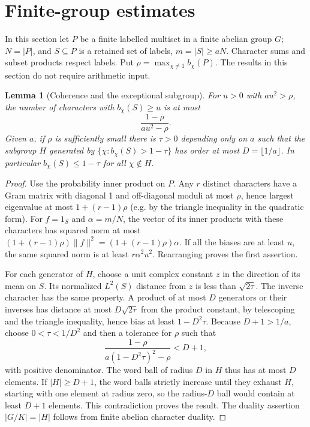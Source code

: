 \documentclass[11pt]{article}
\newtheorem{lemma}[theorem]{Lemma}
\theoremstyle{remark}\newtheorem{remark}[theorem]{Remark}
\newcommand{\norm}[1]{\lVert#1\rVert}\newcommand{\floor}[1]{\lfloor#1\rfloor}\newcommand{\ceil}[1]{\lceil#1\rceil}
\begin{document}
\section{Finite-group estimates}
\label{sec:finite}
In this section let $P$ be a finite labelled multiset in a finite abelian group $G$; $N=|P|$, and $S\subseteq P$ is a retained set of labels, $m=|S|\ge aN$. Character sums and subset products respect labels. Put $\rho=\max_{\chi\ne1}b_\chi(P)$. The results in this section do not require arithmetic input.
\begin{lemma}[Coherence and the exceptional subgroup]\label{lem:gram}
For $u>0$ with $au^2>\rho$, the number of characters with $b_\chi(S)\ge u$ is at most
\[
 \frac{1-\rho}{au^2-\rho}.
\]
Given $a$, if $\rho$ is sufficiently small there is $\tau>0$ depending only on $a$ such that the subgroup $H$ generated by $\{\chi:b_\chi(S)>1-\tau\}$ has order at most $D=\floor{1/a}$. In particular $b_\chi(S)\le1-\tau$ for all $\chi\notin H$.
\end{lemma}
\begin{proof}
Use the probability inner product on $P$. Any $r$ distinct characters have a Gram matrix with diagonal 1 and off-diagonal moduli at most $\rho$, hence largest eigenvalue at most $1+(r-1)\rho$ (e.g. by the triangle inequality in the quadratic form). For $f=1_S$ and $\alpha=m/N$, the vector of its inner products with these characters has squared norm at most $(1+(r-1)\rho)\norm{f}^2=(1+(r-1)\rho)\alpha$. If all the biases are at least $u$, the same squared norm is at least $r\alpha^2u^2$. Rearranging proves the first assertion.

For each generator of $H$, choose a unit complex constant $z$ in the direction of its mean on $S$. Its normalized $L^2(S)$ distance from $z$ is less than $\sqrt{2\tau}$. The inverse character has the same property. A product of at most $D$ generators or their inverses has distance at most $D\sqrt{2\tau}$ from the product constant, by telescoping and the triangle inequality, hence bias at least $1-D^2\tau$. Because $D+1>1/a$, choose $0<\tau<1/D^2$ and then a tolerance for $\rho$ such that
\[
 \frac{1-\rho}{a(1-D^2\tau)^2-\rho}<D+1,
\]
with positive denominator. The word ball of radius $D$ in $H$ thus has at most $D$ elements. If $|H|\ge D+1$, the word balls strictly increase until they exhaust $H$, starting with one element at radius zero, so the radius-$D$ ball would contain at least $D+1$ elements. This contradiction proves the result. The duality assertion $|G/K|=|H|$ follows from finite abelian character duality.
\end{proof}
\end{document}
